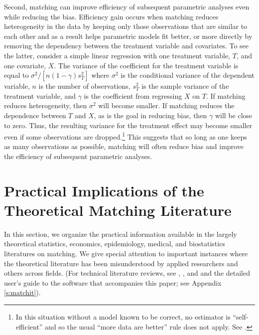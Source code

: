 \documentclass[11pt,titlepage]{article}
\begin{document}
Second, matching can improve efficiency of subsequent parametric
analyses even while reducing the bias. Efficiency gain occurs when
matching reduces heterogeneity in the data by keeping only those
observations that are similar to each other and as a result helps
parametric models fit better, or more directly by removing the
dependency between the treatment variable and covariates.  To see the
latter, consider a simple linear regression with one treatment
variable, $T$, and one covariate, $X$.  The variance of the
coefficient for the treatment variable is equal to $\sigma^2/[n
(1-\gamma) s^2_T]$ where $\sigma^2$ is the conditional variance of the
dependent variable, $n$ is the number of observations, $s^2_T$ is the
sample variance of the treatment variable, and $\gamma$ is the
coefficient from regressing $X$ on $T$. If matching reduces
heterogeneity, then $\sigma^2$ will become smaller.  If matching
reduces the dependence between $T$ and $X$, as is the goal in reducing
bias, then $\gamma$ will be close to zero.  Thus, the resulting
variance for the treatment effect may become smaller even if some
observations are dropped.\footnote{In this situation without a model
  known to be correct, no estimator is ``self-efficient'' and so the
  usual ``more data are better'' rule does not apply.  See
  \citet{MenRom03}.} This suggests that so long as one keeps as many
observations as possible, matching will often reduce bias and improve
the efficiency of subsequent parametric analyses.

\section{Practical Implications of the Theoretical Matching
  Literature}
\label{s:choose}

In this section, we organize the practical information available in
the largely theoretical statistics, economics, epidemiology, medical,
and biostatistics literatures on matching.  We give special attention
to important instances where the theoretical literature has been
misunderstood by applied researchers and others across fields.  (For
technical literature reviews, see \citet{Imbens04},
\citet{Rosenbaum02}, and \citet{Stuart04} and the detailed user's
guide to the software that accompanies this paper; see Appendix
\ref{s:matchit}).
\end{document}
